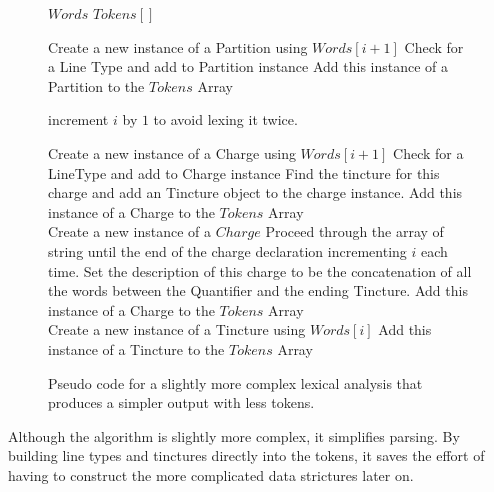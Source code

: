 \begin{figure}[H]
\begin{algorithmic}[1]


\STATE $Words $ 
\STATE $Tokens[]$ \\

		\STATE Create a new instance of a Partition using $Words[i+1]$
		\STATE Check for a Line Type and add to Partition instance
		\STATE Add this instance of a Partition to the $Tokens$ Array

		\STATE increment $i$ by $1$ to avoid lexing it twice. 

		\STATE Create a new instance of a Charge using $Words[i+1]$
		\STATE Check for a LineType and add to Charge instance
		\STATE Find the tincture for this charge and add an Tincture object to the charge instance. 
		\STATE Add this instance of a Charge to the $Tokens$ Array \\

		\STATE Create a new instance of a $Charge$ 
		\STATE Proceed through the array of string until the end of the charge declaration incrementing $i$ each time.  
		\STATE Set the description of this charge to be the concatenation of all the words between the Quantifier and the ending Tincture.
		\STATE Add this instance of a Charge to the $Tokens$ Array \\

		\STATE Create a new instance of a Tincture using $Words[i]$
		\STATE Add this instance of a Tincture to the $Tokens$ Array
 	\ENDIF
\ENDFOR

\end{algorithmic}
\caption{Pseudo code for a slightly more complex lexical analysis that produces a simpler output with less tokens.}
\end{figure}

Although the algorithm is slightly more complex, it simplifies parsing.  By building line types and tinctures directly into the tokens, it saves the effort of having to construct the more complicated data strictures later on. 


